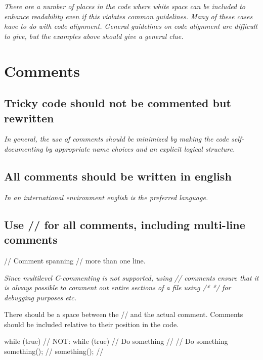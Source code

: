 \documentclass[a4paper,11pt,oneside]{scrbook}
\newcommand{\guideline}[1]{{\subsection{#1}}}
\newcommand{\motivation}[1]{{\normalfont \itshape #1}}
\newcommand{\trcode}[1]{{\normalfont \ttfamily #1}}
\begin{document}
\motivation{
  There are a number of places in the code where white space can be
  included to enhance readability even if this violates common
  guidelines. Many of these cases have to do with code
  alignment. General guidelines on code alignment are difficult to give,
  but the examples above should give a general clue.
}

\section{Comments}

\guideline{Tricky code should not be commented but rewritten}

\motivation{
  In general, the use of comments should be minimized by making the code
  self-documenting by appropriate name choices and an explicit logical
  structure.
}

\guideline{All comments should be written in english}

\motivation{
  In an international environment english is the preferred language.
}

\guideline{Use \trcode{//} for all comments, including multi-line comments}

\begin{code}
  // Comment spanning
  // more than one line. 
\end{code}

\motivation{
  Since multilevel C-commenting is not supported, using \trcode{//} comments
  ensure that it is always possible to comment out entire sections of a
  file using \trcode{/* */} for debugging purposes etc.
}

There should be a space between the \trcode{//} and the actual comment.
Comments should be included relative to their position in the code.

\begin{code}
  while (true) {          // NOT:    while (true) {
    // Do something       //         // Do something
    something();          //           something();
  }                       //         } 
\end{code}
\end{document}
